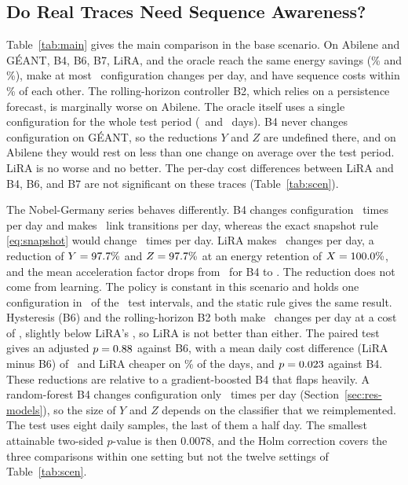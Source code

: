 \documentclass[journal]{IEEEtran}
\begin{document}
\subsection{Do Real Traces Need Sequence Awareness?}\label{sec:res-main}

Table~\ref{tab:main} gives the main comparison in the base scenario. On Abilene and G\'{E}ANT, B4, B6, B7, LiRA, and the oracle reach the same energy savings (\abiSav\% and \geaSav\%), make at most \abiBFourchg\ configuration changes per day, and have sequence costs within \realSpread\% of each other. The rolling-horizon controller B2, which relies on a persistence forecast, is marginally worse on Abilene. The oracle itself uses a single configuration for the whole test period (\abiTestDays\ and \geaTestDays\ days). B4 never changes configuration on G\'{E}ANT, so the reductions $Y$ and $Z$ are undefined there, and on Abilene they would rest on less than one change on average over the test period. LiRA is no worse and no better. The per-day cost differences between LiRA and B4, B6, and B7 are not significant on these traces (Table~\ref{tab:scen}).

\begin{table}[t]
\centering
\caption{Main Comparison in the Base Scenario (Test Split). Means with 95\% Confidence Intervals over Five Seeds for B4, B6, B7, and LiRA; Single Values Otherwise. Latency Is the Median Decision Time}
\label{tab:main}
\footnotesize
\setlength{\tabcolsep}{4pt}

\end{table}

The Nobel-Germany series behaves differently. B4 changes configuration \nobBFourchg\ times per day and makes \nobBFourtrans\ link transitions per day, whereas the exact snapshot rule \eqref{eq:snapshot} would change \nobSnapChg\ times per day. LiRA makes \nobLiRAchg\ changes per day, a reduction of $Y=97.7\%$ and $Z=97.7\%$ at an energy retention of $X=100.0\%$, and the mean acceleration factor drops from \nobAFfour\ for B4 to \nobAFlira. The reduction does not come from learning. The policy is constant in this scenario and holds one configuration in \liraHold\ of the \nobTestIntervals\ test intervals, and the static rule gives the same result. Hysteresis (B6) and the rolling-horizon B2 both make \nobBsixChg\ changes per day at a cost of \nobJBsixbase, slightly below LiRA's \nobJLiRAbase, so LiRA is not better than either. The paired test gives an adjusted $p=0.88$ against B6, with a mean daily cost difference (LiRA minus B6) of \effBsixbase\ and LiRA cheaper on \effBsixDaysbase\% of the days, and $p=0.023$ against B4. These reductions are relative to a gradient-boosted B4 that flaps heavily. A random-forest B4 changes configuration only \modRfChg\ times per day (Section~\ref{sec:res-models}), so the size of $Y$ and $Z$ depends on the classifier that we reimplemented. The test uses eight daily samples, the last of them a half day. The smallest attainable two-sided $p$-value is then $0.0078$, and the Holm correction covers the three comparisons within one setting but not the twelve settings of Table~\ref{tab:scen}.
\end{document}
